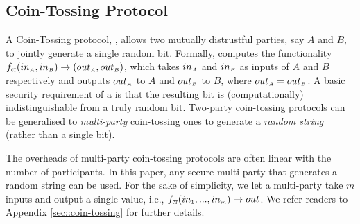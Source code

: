 


\vspace{-2mm}



\subsection{Coin-Tossing Protocol}\label{sec::short-coin-tossing}
\vspace{-.5mm}

A Coin-Tossing protocol, \ct, allows two mutually distrustful parties, say $A$ and $B$, to jointly generate a single random bit. Formally, \ct computes the functionality $f_{\scriptscriptstyle \mathtt{CT}}(in_{\scriptscriptstyle A}, in_{\scriptscriptstyle B})\rightarrow (out_{\scriptscriptstyle A}, out_{\scriptscriptstyle B})$, which takes $in_{\scriptscriptstyle A}$ and  $in_{\scriptscriptstyle B}$ as inputs of $A$ and $B$ respectively and outputs $out_{\scriptscriptstyle A}$ to $A$ and $out_{\scriptscriptstyle B}$ to $B$, where $out_{\scriptscriptstyle A}=out_{\scriptscriptstyle B}$. A basic security requirement of a \ct is that the resulting bit is (computationally) indistinguishable from a truly random bit. 
%
Two-party coin-tossing protocols can be generalised to \emph{multi-party} coin-tossing ones to generate a \emph{random string} (rather than a single bit). 

The overheads of multi-party coin-tossing protocols are often linear with the number of participants. In this paper, any secure multi-party \ct that generates a random string can be used. For the sake of simplicity, we let a multi-party \fct take $m$ inputs and output a single value, i.e., $f_{\scriptscriptstyle \mathtt{CT}}(in_{\scriptscriptstyle 1}, ..., in_{\scriptscriptstyle m})\rightarrow out$. We refer readers to Appendix \ref{sec::coin-tossing} for further details. 

 


